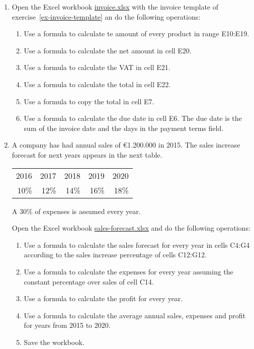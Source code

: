 \begin{enumerate}[leftmargin=*,resume]
\item Open the Excel workbook
\href{http://aprendeconalf.es/office/excel/exercises/introduction/invoice.xlsx}{\textsf{invoice.xlsx}}
with the invoice template of exercise~\ref{ex-invoice-template} an do the following operations:
\begin{enumerate}
\item Use a formula to calculate te amount of every product in range E10:E19.
\item Use a formula to calculate the net amount in cell E20.
\item Use a formula to calculate the VAT in cell E21.
\item Use a formula to calculate the total in cell E22.
\item Use a formula to copy the total in cell E7.
\item Use a formula to calculate the due date in cell E6.
The due date is the sum of the invoice date and the days in the payment terms field.
\end{enumerate}

\item \label{ex-sales-forecast}A company has had annual sales of €1.200.000 in 2015.
The sales increase forecast for next years appears in the next table.
\begin{center} 
\begin{tabular}{rrrrr}
\toprule 
2016 & 2017 & 2018 & 2019 & 2020\\
10\% & 12\% & 14\% & 16\% & 18\%\\
\bottomrule
\end{tabular}
\end{center}
A 30\% of expenses is assumed every year.

Open the Excel workbook
\href{http://aprendeconalf.es/office/excel/exercises/formulas/sales-forecast.xlsx}{\textsf{sales-forecast.xlsx}} and do
the following operations:

\begin{enumerate}
\item Use a formula to calculate the sales forecast for every year in cells C4:G4 according to the sales increase percentage of
cells C12:G12.
\item Use a formula to calculate the expenses for every year assuming the constant percentage over sales of cell C14.
\item Use a formula to calculate the profit for every year. 
\item Use a formula to calculate the average annual sales, expenses and profit for years from 2015 to 2020.
\item Save the workbook.
\end{enumerate}


\end{enumerate}
